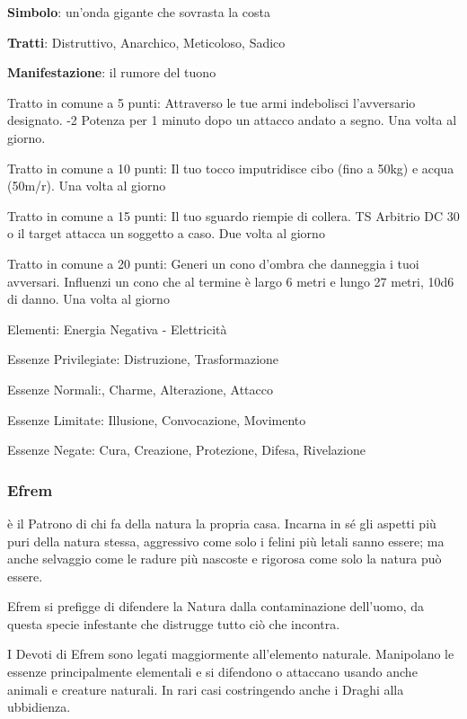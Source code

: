\documentclass[a4paper,11pt,twoside,openany]{book}
\begin{document}
{\textbf{Simbolo}: un'onda gigante che sovrasta la costa

\textbf{Tratti}: Distruttivo, Anarchico, Meticoloso, Sadico

\textbf{Manifestazione}: il rumore del tuono

\bigskip

Tratto in comune a 5 punti: Attraverso le tue armi indebolisci l'avversario designato. -2 Potenza per 1 minuto dopo un attacco andato a segno. Una volta al giorno.

Tratto in comune a 10 punti: Il tuo tocco imputridisce cibo (fino a 50kg) e acqua (50m/r). Una volta al giorno

Tratto in comune a 15 punti: Il tuo sguardo riempie di collera. TS Arbitrio DC 30 o il target attacca un soggetto a caso. Due volta al giorno

Tratto in comune a 20 punti: Generi un cono d'ombra che danneggia i tuoi avversari. Influenzi un cono che al termine è largo 6 metri e lungo 27 metri, 10d6 di danno. Una volta al giorno

\bigskip

Elementi: Energia Negativa - Elettricità

\bigskip

Essenze Privilegiate: Distruzione, Trasformazione

Essenze Normali:, Charme, Alterazione, Attacco

Essenze Limitate: Illusione, Convocazione, Movimento
 
Essenze Negate: Cura, Creazione, Protezione, Difesa, Rivelazione

\subsubsection{Efrem}

\label{efrem}

è il Patrono di chi fa della natura la propria casa. Incarna in sé gli aspetti più puri della natura stessa, aggressivo come solo i felini più letali sanno essere; ma anche selvaggio come le radure più nascoste e rigorosa come solo la natura può essere.

Efrem si prefigge di difendere la Natura dalla contaminazione dell'uomo, da questa specie infestante che distrugge tutto ciò che incontra.

I Devoti di Efrem sono legati maggiormente all'elemento naturale. Manipolano le essenze principalmente elementali e si difendono o attaccano usando anche animali e creature naturali. In rari casi costringendo anche i Draghi alla ubbidienza.

}
\end{document}

